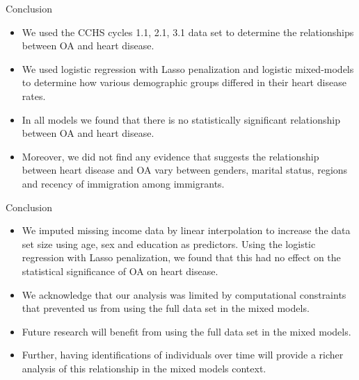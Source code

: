 \begin{frame}{Conclusion}
\begin{itemize}
    \item We used the CCHS cycles 1.1, 2.1, 3.1 data set to determine the relationships between OA and heart disease. 
    \item We used logistic regression with Lasso penalization and logistic mixed-models to determine how various demographic groups differed in their heart disease rates.
    \item In all models we found that there is no statistically significant relationship between OA and heart disease. 
    \item Moreover, we did not find any evidence that suggests the relationship between heart disease and OA vary between genders, marital status, regions and recency of immigration among immigrants. 

\end{itemize}
\end{frame}

\begin{frame}{Conclusion}
\begin{itemize}
    \item We imputed missing income data by linear interpolation to increase the data set size using age, sex and education as predictors. Using the logistic regression with Lasso penalization, we found that this had no effect on the statistical significance of OA on heart disease.
    \item We acknowledge that our analysis was limited by computational constraints that prevented us from using the full data set in the mixed models.
    \item Future research will benefit from using the full data set in the mixed models.
    \item Further, having identifications of individuals over time will provide a richer analysis of this relationship in the mixed models context.
\end{itemize}
\end{frame}
